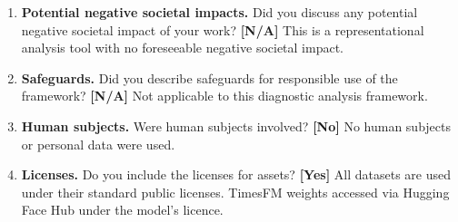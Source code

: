 \documentclass[10pt]{article}
\theoremstyle{definition}
\theoremstyle{remark}
\newcommand{\answerYes}[1]{\textbf{[Yes]} #1}
\newcommand{\answerNo}[1]{\textbf{[No]} #1}
\newcommand{\answerNA}[1]{\textbf{[N/A]} #1}
\begin{document}
\begin{enumerate}
\item \textbf{Potential negative societal impacts.}
  Did you discuss any potential negative societal impact of your work?
  \answerNA{This is a representational analysis tool with no foreseeable
  negative societal impact.}

\item \textbf{Safeguards.}
  Did you describe safeguards for responsible use of the framework?
  \answerNA{Not applicable to this diagnostic analysis framework.}

\item \textbf{Human subjects.}
  Were human subjects involved?
  \answerNo{No human subjects or personal data were used.}

\item \textbf{Licenses.}
  Do you include the licenses for assets?
  \answerYes{All datasets are used under their standard public licenses.
  TimesFM weights accessed via Hugging Face Hub under the model's licence.}

\end{enumerate}
\end{document}
